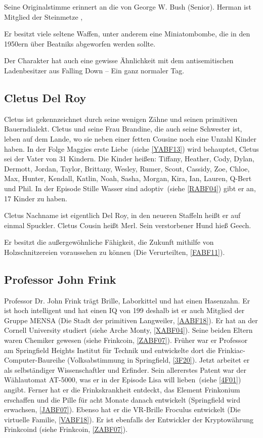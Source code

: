 {Seine Originalstimme erinnert an die von George W. Bush (Senior). Herman ist Mitglied der Steinmetze \cite{uloc},

Er besitzt viele seltene Waffen, unter anderem eine Miniatombombe, die in den 1950ern über Beatniks abgeworfen werden sollte.

Der Charakter hat auch eine gewisse Ähnlichkeit mit dem antisemitischen Ladenbesitzer aus \glqq Falling Down -- Ein ganz normaler Tag\grqq .

\subsection{Cletus Del Roy}\label{CletusSpuckler}
Cletus ist gekennzeichnet durch seine wenigen Zähne und seinen primitiven Bauerndialekt. Cletus und seine Frau Brandine, die auch seine Schwester ist, leben auf dem Lande, wo sie neben einer fetten Cousine noch eine Unzahl Kinder haben. In der Folge \glqq Maggies erste Liebe\grqq\ (siehe \ref{YABF13}) wird behauptet, Cletus sei der Vater von 31 Kindern. Die Kinder heißen: Tiffany, Heather, Cody, Dylan, Dermott, Jordan, Taylor, Brittany, Wesley, Rumer, Scout, Cassidy, Zoe, Chloe, Max, Hunter, Kendall, Katlin, Noah, Sasha, Morgan, Kira, Ian, Lauren, Q-Bert und Phil. In der Episode \glqq Stille Wasser sind adoptiv\grqq\ (siehe \ref{RABF04}) gibt er an, 17 Kinder zu haben.

Cletus Nachname ist eigentlich Del Roy, in den neueren Staffeln heißt er auf einmal Spuckler. Cletus Cousin heißt Merl. Sein verstorbener Hund hieß Geech.

Er besitzt die außergewöhnliche Fähigkeit, die Zukunft mithilfe von Holzschnitzereien voraussehen zu können (\glqq Die Verurteilten\grqq , \ref{FABF11}). 


\subsection{Professor John Frink}\label{JohnFrink}
Professor Dr. John Frink trägt Brille, Laborkittel und hat einen Hasenzahn. Er ist hoch intelligent und hat einen IQ von 199 deshalb ist er auch Mitglied der Gruppe MENSA (\glqq Die Stadt der primitiven Langweiler\grqq , \ref{AABF18}). Er hat an der Cornell University studiert (siehe \glqq Arche Monty\grqq, \ref{XABF04}). Seine beiden Eltern waren Chemiker gewesen (siehe \glqq Frinkcoin\grqq, \ref{ZABF07}). Früher war er Professor am Springfield Heights Institut für Technik und entwickelte dort die \glqq Frinkiac\grqq -Computer-Baureihe (\glqq Volksabstimmung in Springfield\grqq , \ref{3F20}). Jetzt arbeitet er als selbständiger Wissenschaftler und Erfinder. Sein allererstes Patent war der Wählautomat AT-5000, was er in der Episode \glqq Lisa will lieben\grqq\ (siehe \ref{4F01}) angibt. Ferner hat er die Frinkskrankheit entdeckt, das Element Frinkonium erschaffen und die Pille für acht Monate danach entwickelt (\glqq Springfield wird erwachsen\grqq , \ref{JABF07}). Ebenso hat er die VR-Brille Froculus entwickelt (\glqq Die virtuelle Familie\grqq, \ref{VABF18}). Er ist ebenfalls der Entwickler der Kryptowährung Frinkcoind (siehe \glqq Frinkcoin\grqq, \ref{ZABF07}).

}
